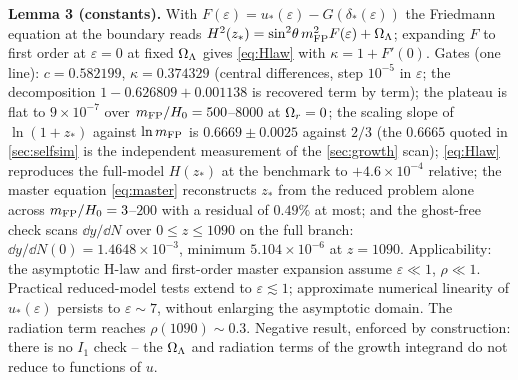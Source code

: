 \textbf{Lemma 3 (constants).} With $F(\varepsilon)=u_*(\varepsilon)-G(\delta_*(\varepsilon))$ the Friedmann equation at the boundary reads $H^2(z_*)=\sin^2\!\theta\,m_{\mathrm{FP}}^2F(\varepsilon)+\Omega_{\Lambda}$; expanding $F$ to first order at $\varepsilon=0$ at fixed $\Omega_{\Lambda}$ gives \eqref{eq:Hlaw} with $\kappa=1+F'(0)$. Gates (one line): $c=0.582199$, $\kappa=0.374329$ (central differences, step $10^{-5}$ in $\varepsilon$; the decomposition $1-0.626809+0.001138$ is recovered term by term); the plateau is flat to $9\times10^{-7}$ over $m_{\mathrm{FP}}/H_0=500$--$8000$ at $\Omega_{r}=0$; the scaling slope of $\ln(1+z_*)$ against $\ln m_{\mathrm{FP}}$ is $0.6669\pm0.0025$ against $2/3$ (the $0.6665$ quoted in \cref{sec:selfsim} is the independent measurement of the \cref{sec:growth} scan); \eqref{eq:Hlaw} reproduces the full-model $H(z_*)$ at the benchmark to $+4.6\times10^{-4}$ relative; the master equation \eqref{eq:master} reconstructs $z_*$ from the reduced problem alone across $m_{\mathrm{FP}}/H_0=3$--$200$ with a residual of $0.49\%$ at most; and the ghost-free check scans $\dd y/\dd N$ over $0\le z\le1090$ on the full branch: $\dd y/\dd N(0)=1.4648\times10^{-3}$, minimum $5.104\times10^{-6}$ at $z=1090$. Applicability: the asymptotic H-law and first-order master expansion assume $\varepsilon\ll1$, $\rho\ll1$. Practical reduced-model tests extend to $\varepsilon\lesssim1$; approximate numerical linearity of $u_*(\varepsilon)$ persists to $\varepsilon\sim7$, without enlarging the asymptotic domain. The radiation term reaches $\rho(1090)\sim0.3$. Negative result, enforced by construction: there is no $I_1$ check -- the $\Omega_{\Lambda}$ and radiation terms of the growth integrand do not reduce to functions of $u$.
